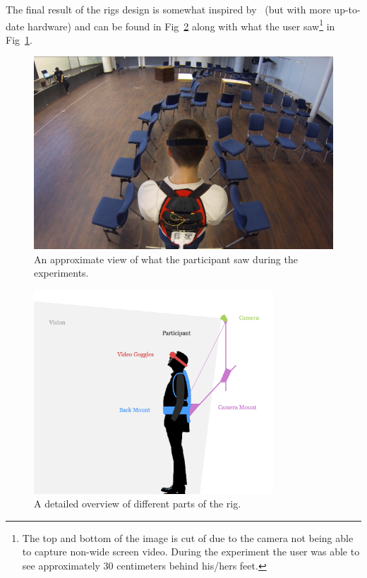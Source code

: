 \documentclass[runningheads,a4paper,oribibl]{llncs}
\begin{document}
The final result of the rigs design is somewhat inspired by~\cite{salamin2010quantifying} (but with more up-to-date hardware) and can be found in Fig~\ref{fig:RigDesign} along with what the user saw\footnote{The top and bottom of the image is cut of due to the camera not being able to capture non-wide screen video. During the experiment the user was able to see approximately 30 centimeters behind his/hers feet.} in Fig~\ref{fig:3Pview}.





\begin{figure}
   \centering
   \includegraphics[width=\textwidth]{ExternalMaterial/3Pview}

   \caption{An approximate view of what the participant saw during the experiments. \label{fig:3Pview}}
\end{figure}



\begin{figure}
   \centering
   \includegraphics[width=0.8\textwidth]{ExternalMaterial/Rig}
   \caption{A detailed overview of different parts of the rig. \label{fig:RigDesign}}
\end{figure}
\end{document}

